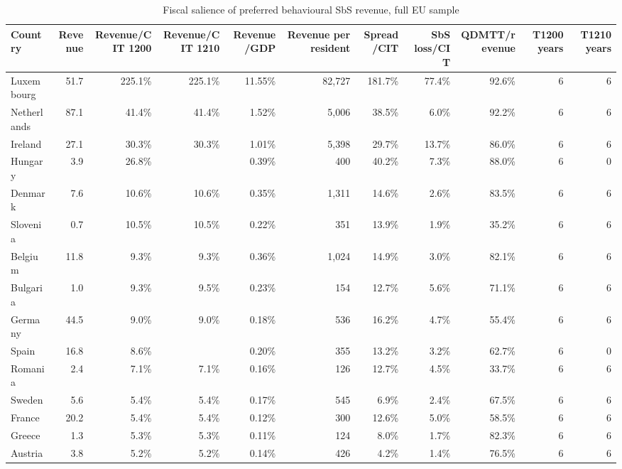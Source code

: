 \begin{table}[H]
\centering
\scriptsize
\caption{Fiscal salience of preferred behavioural SbS revenue, full EU sample}
\label{tab:app_country_fiscal_salience_full}
\begin{adjustbox}{max width=\textwidth,center}
\begin{tabular}{@{}lrrrrrrrrrr@{}}
\toprule
Country & Revenue & Revenue/CIT 1200 & Revenue/CIT 1210 & Revenue/GDP & Revenue per resident & Spread/CIT & SbS loss/CIT & QDMTT/revenue & T1200 years & T1210 years \\
\midrule
Luxembourg & 51.7 & 225.1\% & 225.1\% & 11.55\% & 82,727 & 181.7\% & 77.4\% &  92.6\% & 6 & 6 \\
Netherlands & 87.1 &  41.4\% &  41.4\% &  1.52\% &  5,006 &  38.5\% &  6.0\% &  92.2\% & 6 & 6 \\
Ireland & 27.1 &  30.3\% &  30.3\% &  1.01\% &  5,398 &  29.7\% & 13.7\% &  86.0\% & 6 & 6 \\
Hungary &  3.9 &  26.8\% &  &  0.39\% &    400 &  40.2\% &  7.3\% &  88.0\% & 6 & 0 \\
Denmark &  7.6 &  10.6\% &  10.6\% &  0.35\% &  1,311 &  14.6\% &  2.6\% &  83.5\% & 6 & 6 \\
Slovenia &  0.7 &  10.5\% &  10.5\% &  0.22\% &    351 &  13.9\% &  1.9\% &  35.2\% & 6 & 6 \\
Belgium & 11.8 &   9.3\% &   9.3\% &  0.36\% &  1,024 &  14.9\% &  3.0\% &  82.1\% & 6 & 6 \\
Bulgaria &  1.0 &   9.3\% &   9.5\% &  0.23\% &    154 &  12.7\% &  5.6\% &  71.1\% & 6 & 6 \\
Germany & 44.5 &   9.0\% &   9.0\% &  0.18\% &    536 &  16.2\% &  4.7\% &  55.4\% & 6 & 6 \\
Spain & 16.8 &   8.6\% &  &  0.20\% &    355 &  13.2\% &  3.2\% &  62.7\% & 6 & 0 \\
Romania &  2.4 &   7.1\% &   7.1\% &  0.16\% &    126 &  12.7\% &  4.5\% &  33.7\% & 6 & 6 \\
Sweden &  5.6 &   5.4\% &   5.4\% &  0.17\% &    545 &   6.9\% &  2.4\% &  67.5\% & 6 & 6 \\
France & 20.2 &   5.4\% &   5.4\% &  0.12\% &    300 &  12.6\% &  5.0\% &  58.5\% & 6 & 6 \\
Greece &  1.3 &   5.3\% &   5.3\% &  0.11\% &    124 &   8.0\% &  1.7\% &  82.3\% & 6 & 6 \\
Austria &  3.8 &   5.2\% &   5.2\% &  0.14\% &    426 &   4.2\% &  1.4\% &  76.5\% & 6 & 6 \\

\end{tabular}
\end{adjustbox}
\end{table}
